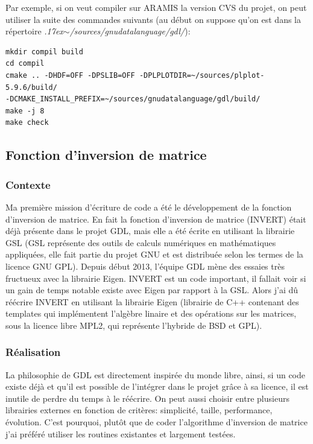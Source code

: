 Par exemple, si on veut compiler sur \textsc {ARAMIS} la version CVS du projet,
on peut utiliser la suite des commandes suivants (au début on suppose qu'on
est dans la répertoire \textit{{\raise.17ex\hbox{$\scriptstyle\sim$}}/sources/gnudatalanguage/gdl/}):


\begin{lstlisting}
mkdir compil build
cd compil
cmake .. -DHDF=OFF -DPSLIB=OFF -DPLPLOTDIR=~/sources/plplot-5.9.6/build/ 
-DCMAKE_INSTALL_PREFIX=~/sources/gnudatalanguage/gdl/build/ 
make -j 8
make check
\end{lstlisting}


\subsection{Fonction d'inversion de matrice}

\subsubsection{Contexte}

Ma première mission d’écriture de code a été le développement de la fonction
d'inversion de matrice. En fait la fonction d’inversion de matrice
(INVERT) était déjà présente dans le projet GDL, mais elle a été écrite en
utilisant la librairie GSL (GSL représente des outils de calculs numériques en
mathématiques appliquées, elle fait partie du projet GNU et est distribuée selon
les termes de la licence GNU GPL). Depuis début 2013, l’équipe GDL mène des essaies très fructueux avec la librairie Eigen. INVERT est un code important, il fallait voir si un gain de temps notable existe avec Eigen par rapport à la GSL. Alors j'ai dû réécrire INVERT en utilisant la librairie Eigen (librairie de C++ contenant des templates qui implémentent l’algèbre linaire et des opérations sur les matrices, sous la licence libre MPL2, qui représente l'hybride de BSD et GPL).

\subsubsection{Réalisation}
La philosophie de GDL est directement inspirée du monde libre, ainsi, si un code
existe déjà et qu’il est possible de l’intégrer dans le projet grâce à sa
licence, il est inutile de perdre du temps à le réécrire. On peut aussi choisir
entre plusieurs librairies externes en fonction de critères: simplicité,
taille, performance, évolution. C'est pourquoi, plutôt que de coder l’algorithme
d'inversion de matrice j'ai préféré utiliser les routines existantes et largement testées.

